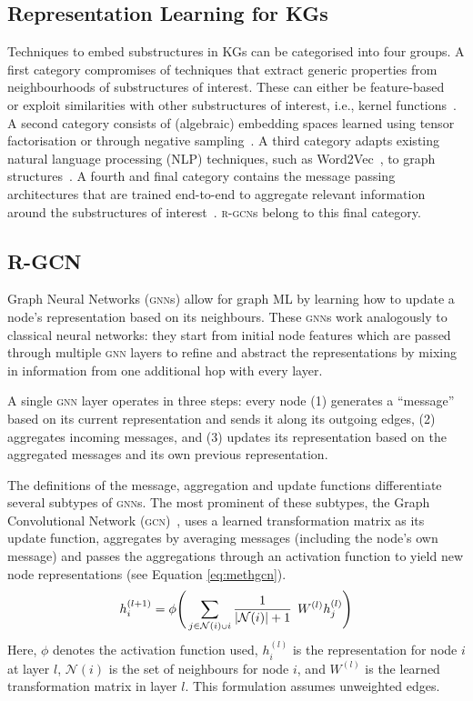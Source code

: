 \documentclass{llncs}
\begin{document}
\subsection{Representation Learning for KGs}
Techniques to embed substructures in KGs can be categorised into four groups. A first category compromises of techniques that extract generic properties from neighbourhoods of substructures of interest. These can either be feature-based~\cite{Steenwinckel2021INK,vandewiele2020mindwalc} or exploit similarities with other substructures of interest, i.e., kernel functions~\cite{de2013fast,vishwanathan2010graph}. A second category consists of (algebraic) embedding spaces learned using tensor factorisation or through negative sampling~\cite{bordes2013translating,kazemi2018simple,yang2015embedding,dettmers2018convolutional,zhang2019quaternion}. A third category adapts existing natural language processing (NLP) techniques, such as Word2Vec~\cite{mikolov2013efficient}, to graph structures~\cite{ristoski2016rdf2vec}. A fourth and final category contains the message passing architectures that are trained end-to-end to aggregate relevant information around the substructures of interest~\cite{schlichtkrull2018modeling,2019transgcn,nathani2019learning,compgcn}. \textsc{r-gcn}s belong to this final category.

\subsection{R-GCN}
Graph Neural Networks (\textsc{gnn}s) allow for graph ML by learning how to update a node's representation based on its neighbours. These \textsc{gnn}s work analogously to classical neural networks: they start from initial node features which are passed through multiple \textsc{gnn} layers to refine and abstract the representations by mixing in information from one additional hop with every layer.

A single \textsc{gnn} layer operates in three steps: every node (1) generates a ``message'' based on its current representation and sends it along its outgoing edges, (2) aggregates incoming messages, and (3) updates its representation based on the aggregated messages and its own previous representation.

The definitions of the message, aggregation and update functions differentiate several subtypes of \textsc{gnn}s. The most prominent of these subtypes, the Graph Convolutional Network (\textsc{gcn})~\cite{kipf2016semi}, uses a learned transformation matrix as its update function, aggregates by averaging messages (including the node's own message) and passes the aggregations through an activation function to yield new node representations (see Equation \ref{eq:methgcn}).
\begin{equation}
    \label{eq:methgcn}
    h_i^{(l+1)} = \phi \Bigg(\sum_{j \in \mathcal{N}(i) \mathsmaller{\cup}  i} \frac{1}{|\mathcal{N}(i)| + 1} \;\, W^{(l)} h_j^{(l)} \Bigg)
\end{equation}
Here, $\phi$ denotes the activation function used, $h_i^{(l)}$ is the representation for node $i$ at layer $l$, $\mathcal{N}(i)$ is the set of neighbours for node $i$, and $W^{(l)}$ is the learned transformation matrix in layer $l$. This formulation assumes unweighted edges.
\end{document}
